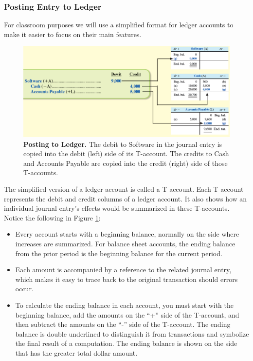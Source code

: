 \documentclass[../main.tex]{subfiles}
\begin{document}
	
	\subsubsection{Posting Entry to Ledger}
	
	For classroom purposes we will use a simplified format for ledger accounts 
	to make it easier to focus on their main features. 
	
	\begin{figure}[ht]
		\centering
		\includegraphics[width=1\columnwidth]{images/c2/post_entry.png}
		\caption{\label{fig:posting}\textbf{Posting to Ledger.} The debit to 
		Software in the 
		journal entry is copied into the debit (left) 
			side of its T-account. The credits to Cash and Accounts Payable are 
			copied 
			into the credit (right) side of those T-accounts.}	
	\end{figure}
	
	The simplified version 
	of a ledger account is called a T-account. Each T-account represents the 
	debit and credit columns of a ledger account. It also shows how an 
	individual journal entry’s effects would be summarized in these T-accounts. 
	Notice the following in Figure \ref{fig:posting}:
	\begin{itemize}[noitemsep]
		\item Every account starts with a beginning balance, normally on the 
		side where increases are summarized. For balance sheet accounts, the 
		ending balance from the prior period is the beginning balance for the 
		current period.
		\item Each amount is accompanied by a reference to the related journal 
		entry, which makes it easy to trace back to the original transaction 
		should errors occur.
		\item To calculate the ending balance in each account, you must start 
		with the beginning balance, add the amounts on the “+” side of the 
		T-account, and then subtract the amounts on the “-” side of the 
		T-account. The ending balance is double underlined to distinguish it 
		from transactions and symbolize the final result of a computation. The 
		ending balance is shown on the side that has the greater total dollar 
		amount.
	\end{itemize}
	
\end{document}
